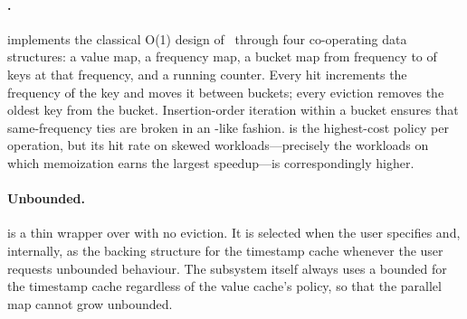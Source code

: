 \paragraph{\lfu.}  implements the classical O(1) \lfu design of~\cite{pin2010lfu} through four co-operating data structures: a value map, a frequency map, a bucket map from frequency to  of keys at that frequency, and a running  counter. Every hit increments the frequency of the key and moves it between buckets; every eviction removes the oldest key from the  bucket. Insertion-order iteration within a bucket ensures that same-frequency ties are broken in an \lru-like fashion. \lfu is the highest-cost policy per operation, but its hit rate on skewed workloads---precisely the workloads on which memoization earns the largest speedup---is correspondingly higher.

\paragraph{Unbounded.}  is a thin wrapper over  with no eviction. It is selected when the user specifies  and, internally, as the backing structure for the \ttl timestamp cache whenever the user requests unbounded behaviour. The \ttl subsystem itself always uses a bounded \lru for the timestamp cache regardless of the value cache's policy, so that the parallel map cannot grow unbounded.
